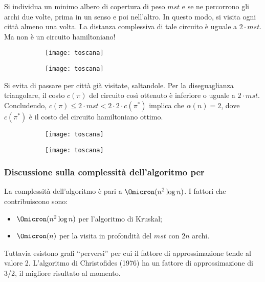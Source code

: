 Si individua un minimo albero di copertura di peso \(\mathit{mst}\) e se ne percorrono gli archi due volte, prima in un senso e poi nell'altro.
In questo modo, si visita ogni città almeno una volta.
La distanza complessiva di tale circuito è uguale a \(2 \cdot mst\).
Ma non è un circuito hamiltoniano!

\begin{figure}[H]\centering
	\begin{subfigure}[t]{.5\linewidth}\centering
		\texttt{[image: toscana]}
	\end{subfigure}%
	\begin{subfigure}[t]{.5\linewidth}\centering
		\texttt{[image: toscana]}
	\end{subfigure}
\end{figure}

Si evita di passare per città già visitate, saltandole.
Per la diseguaglianza triangolare, il costo \(c(\pi)\) del circuito così ottenuto è inferiore o uguale a \(2 \cdot \mathit{mst}\).
Concludendo, \(c(\pi) \leqslant 2 \cdot \mathit{mst} < 2 \cdot 2 \cdot c(\pi^*)\) implica che \(\alpha(n) = 2\), dove \(c(\pi^*)\) è il costo del circuito hamiltoniano ottimo.

\begin{figure}[H]\centering
	\begin{subfigure}[t]{.5\linewidth}\centering
		\texttt{[image: toscana]}
	\end{subfigure}%
	\begin{subfigure}[t]{.5\linewidth}\centering
		\texttt{[image: toscana]}
	\end{subfigure}
\end{figure}

\subsubsection{Discussione sulla complessità dell'algoritmo per \texorpdfstring{\deltaTsp}{}}

La complessità dell'algoritmo è pari a \(\Omicron(n^2 \log n)\).
I fattori che contribuiscono sono:
\begin{itemize}
	\item \(\Omicron(n^2 \log n)\) per l'algoritmo di Kruskal;
	\item \(\Omicron(n)\) per la visita in profondità del \(\mathit{mst}\) con \(2n\) archi.
\end{itemize}
Tuttavia esistono grafi \enquote{perversi} per cui il fattore di approssimazione tende al valore 2.
L'algoritmo di Christofides (1976) ha un fattore di approssimazione di 3/2, il migliore risultato al momento.

